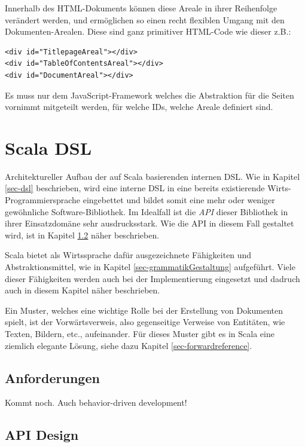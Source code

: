 Innerhalb des HTML-Dokuments können diese Areale in ihrer Reihenfolge
verändert werden, und ermöglichen so einen recht flexiblen Umgang mit
den Doku\-men\-ten-Arealen. Diese sind ganz primitiver HTML-Code wie dieser
z.B.:

\begin{verbatim}
<div id="TitlepageAreal"></div>
<div id="TableOfContentsAreal"></div>
<div id="DocumentAreal"></div>
\end{verbatim}

Es muss nur dem JavaScript-Framework welches die Abstraktion für die
Seiten vornimmt mitgeteilt werden, für welche IDs, welche Areale definiert
sind.


\section{Scala DSL}

Architektureller Aufbau der auf Scala basierenden internen DSL. Wie in
Kapitel \ref{sec-dsl} beschrieben, wird eine interne DSL in eine bereits
existierende Wirts-Programmiersprache eingebettet und bildet somit
eine mehr oder weniger gewöhn\-liche Software-Bibliothek. Im Idealfall ist
die \emph{API} dieser Bibliothek in ihrer Einsatzdomäne sehr ausdrucksstark.
Wie die API in diesem Fall gestaltet wird, ist in Kapitel \ref{sec-apiDesign}
näher beschrieben.

Scala bietet als Wirtssprache dafür ausgezeichnete Fähigkeiten und
Abstraktionsmittel, wie in Kapitel \ref{sec-grammatikGestaltung} aufgeführt.
Viele dieser Fähigkeiten werden auch bei der Implementierung eingesetzt
und dadruch auch in diesem Kapitel näher beschrieben.

Ein Muster, welches eine wichtige Rolle bei der Erstellung von Dokumenten
spielt, ist der Vorwärtsverweis, also gegenseitige Verweise von Entitäten,
wie Texten, Bildern, etc., aufeinander. Für dieses Muster gibt es in Scala
eine ziemlich elegante Lösung, siehe dazu Kapitel \ref{sec-forwardreference}.

\subsection{Anforderungen}

Kommt noch. Auch behavior-driven development!

\subsection{API Design}\label{sec-apiDesign}

